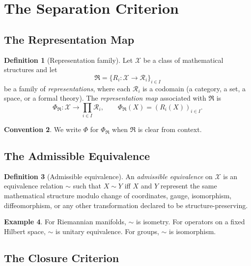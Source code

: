 \documentclass[11pt,a4paper]{article}
\theoremstyle{definition}
\newtheorem{definition}{Definition}[section]
\newtheorem{example}[definition]{Example}
\newtheorem{convention}[definition]{Convention}
\theoremstyle{plain}
\newcommand{\Rcal}{\mathcal{R}}
\newcommand{\Xcal}{\mathcal{X}}
\newcommand{\Rfrak}{\mathfrak{R}}
\newcommand{\Phimap}{\Phi}
\newcommand{\simadm}{\sim}
\begin{document}
\section{The Separation Criterion}
\label{sec:separation}

\subsection{The Representation Map}

\begin{definition}[Representation family]\label{def:rep-family}
Let $\Xcal$ be a class of mathematical structures and let
\[
  \Rfrak = \{ R_i : \Xcal \to \Rcal_i \}_{i \in I}
\]
be a family of \emph{representations}, where each $\Rcal_i$ is a
codomain (a category, a set, a space, or a formal theory). The
\emph{representation map} associated with $\Rfrak$ is
\[
  \Phimap_{\Rfrak} : \Xcal \longrightarrow \prod_{i \in I} \Rcal_i,
  \qquad
  \Phimap_{\Rfrak}(X) = (R_i(X))_{i \in I}.
\]
\end{definition}

\begin{convention}
We write $\Phimap$ for $\Phimap_{\Rfrak}$ when $\Rfrak$ is clear
from context.
\end{convention}

\subsection{The Admissible Equivalence}

\begin{definition}[Admissible equivalence]\label{def:adm-equiv}
An \emph{admissible equivalence} on $\Xcal$ is an equivalence
relation $\simadm$ such that $X \simadm Y$ iff $X$ and $Y$ represent
the same mathematical structure modulo change of coordinates,
gauge, isomorphism, diffeomorphism, or any other transformation
declared to be structure-preserving.
\end{definition}

\begin{example}
For Riemannian manifolds, $\simadm$ is isometry. For operators on a
fixed Hilbert space, $\simadm$ is unitary equivalence. For groups,
$\simadm$ is isomorphism.
\end{example}

\subsection{The Closure Criterion}
\end{document}
